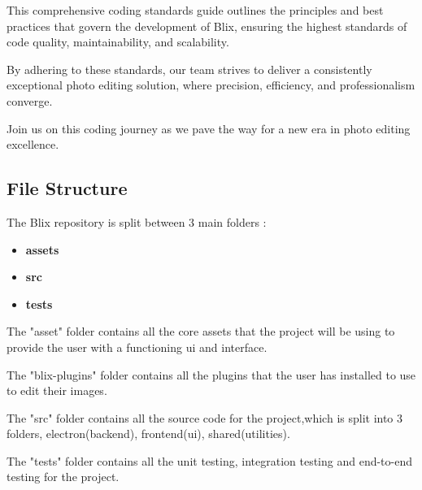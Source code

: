 \documentclass[11pt,a4paper]{article}
\begin{document}
This comprehensive coding standards guide outlines the principles and best practices that govern the development of Blix, ensuring the highest 
standards of code quality, maintainability, and scalability. 

By adhering to these standards, our team strives to deliver a consistently exceptional 
photo editing solution, where precision, efficiency, and professionalism converge. 

Join us on this coding journey as we pave the way for a new era in photo editing excellence.
\pagebreak


\subsection*{File Structure}


\DTsetlength{0.2em}{1em}{0.2em}{0.4pt}{0.4pt}
 
The Blix repository is split between 3 main folders :
\begin{itemize}
    \item[\textbullet] \textbf{assets}
    \item[\textbullet] \textbf{src}
    \item[\textbullet] \textbf{tests}

\end{itemize}

The "asset" folder contains all the core assets that the project will be using to provide the user with a functioning ui and interface.

The "blix-plugins" folder contains all the plugins that the user has installed to use to edit their images.

The "src" folder contains all the source code for the project,which is split into 3 folders, electron(backend), frontend(ui), shared(utilities).

The "tests" folder contains all the unit testing, integration testing and end-to-end testing for the project.

\end{document}

